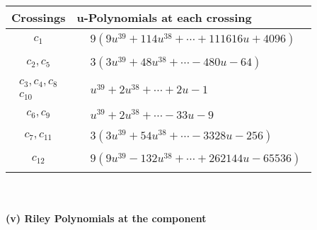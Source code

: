 \documentclass[1p]{elsarticle_modified}
\theoremstyle{definition}
\begin{document}
\begin{tabular}{m{50pt}|m{274pt}}
Crossings & \hspace{64pt}u-Polynomials at each crossing \\
\hline $$\begin{aligned}c_{1}\end{aligned}$$&$\begin{aligned}
&9(9 u^{39}+114 u^{38}+\cdots+111616 u+4096)
\end{aligned}$\\
\hline $$\begin{aligned}c_{2},c_{5}\end{aligned}$$&$\begin{aligned}
&3(3 u^{39}+48 u^{38}+\cdots-480 u-64)
\end{aligned}$\\
\hline $$\begin{aligned}c_{3},c_{4},c_{8}\\c_{10}\end{aligned}$$&$\begin{aligned}
&u^{39}+2 u^{38}+\cdots+2 u-1
\end{aligned}$\\
\hline $$\begin{aligned}c_{6},c_{9}\end{aligned}$$&$\begin{aligned}
&u^{39}+2 u^{38}+\cdots-33 u-9
\end{aligned}$\\
\hline $$\begin{aligned}c_{7},c_{11}\end{aligned}$$&$\begin{aligned}
&3(3 u^{39}+54 u^{38}+\cdots-3328 u-256)
\end{aligned}$\\
\hline $$\begin{aligned}c_{12}\end{aligned}$$&$\begin{aligned}
&9(9 u^{39}-132 u^{38}+\cdots+262144 u-65536)
\end{aligned}$\\
\hline
\end{tabular}\\~\\
\newpage\renewcommand{\arraystretch}{1}
\flushleft \textbf{(v) Riley Polynomials at the component}\newline \\
\end{document}
